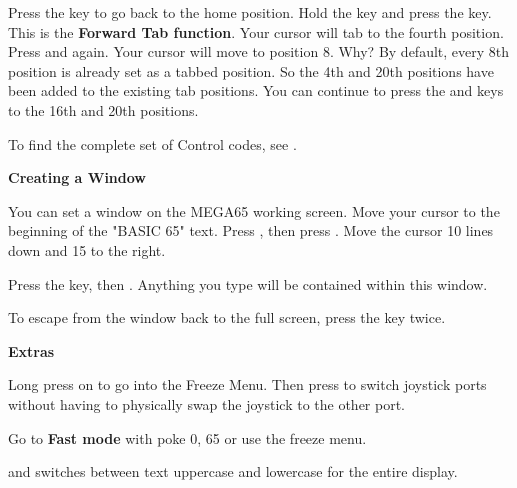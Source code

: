 Press the  key to go back to the home position. Hold the  key and press the  key. This is the \textbf{Forward Tab function}. Your cursor will tab to the fourth position. Press  and  again. Your cursor will move to position 8. Why? By default, every 8th position is already set as a tabbed position. So the 4th and 20th positions have been added to the existing tab positions. You can continue to press the  and  keys to the 16th and 20th positions.

To find the complete set of Control codes, see .


\newpage



\textbf{Creating a Window}

You can set a window on the MEGA65 working screen. Move your cursor to the beginning of the "BASIC 65" text. Press , then press . Move the cursor 10 lines down and 15 to the right.

Press the  key, then . Anything you type will be contained within this window.

To escape from the window back to the full screen, press the  key twice.


\textbf{Extras}

Long press on  to go into the Freeze Menu.  Then press  to switch joystick ports without having to physically swap the joystick to the other port.

Go to \textbf{Fast mode} with poke 0, 65 or use the freeze menu.

 and  switches between text uppercase and lowercase for the entire display.
